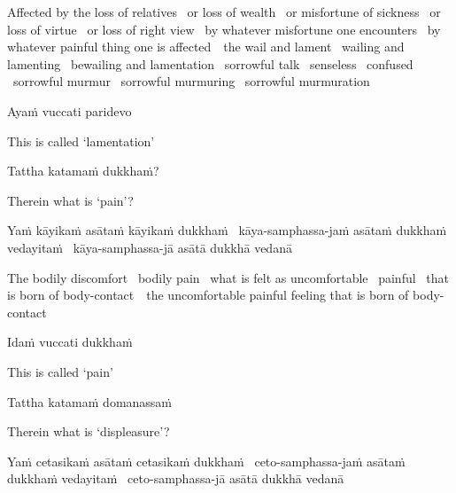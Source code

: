 \begin{english-hang-verses}
  Affected by the loss of relatives \breathmark\ or loss of wealth \breathmark\ or misfortune of sickness \breathmark\ or loss of virtue \breathmark\ or loss of right view \breathmark\ by whatever misfortune one encounters \breathmark\ by whatever painful thing one is \mbox{affected}~\breathmark\ the wail and lament \breathmark\ wailing and lamenting \breathmark\ bewailing and lamentation \breathmark\ sorrowful talk \breathmark\ senseless \breathmark\ confused \breathmark\ sorrowful murmur \breathmark\ sorrowful murmuring \breathmark\ sorrowful murmuration
\end{english-hang-verses}

Ayaṁ vuccati paridevo

\begin{english}
  This is called `lamentation'
\end{english}

Tattha katamaṁ dukkhaṁ?

\begin{english}
  Therein what is `pain'?
\end{english}

\ifbfive\clearpage\fi
\ifninebythirteen\clearpage\fi

\begin{pali-hang}
  Yaṁ kāyikaṁ asātaṁ kāyikaṁ dukkhaṁ \breathmark\ kāya-samphassa-jaṁ asātaṁ dukkhaṁ vedayitaṁ \breathmark\ kāya-samphassa-jā asātā dukkhā vedanā
\end{pali-hang}

\begin{english-hang-verses}
  The bodily discomfort \breathmark\ bodily pain \breathmark\ what is felt as uncomfortable \breathmark\ painful \breathmark\ that is born of \mbox{body-contact}~\breathmark\ the uncomfortable painful feeling that is born of body-contact
\end{english-hang-verses}

Idaṁ vuccati dukkhaṁ

\begin{english}
  This is called `pain'
\end{english}

Tattha katamaṁ domanassaṁ

\begin{english}
  Therein what is `displeasure'?
\end{english}

\begin{pali-hang}
  Yaṁ cetasikaṁ asātaṁ cetasikaṁ dukkhaṁ \breathmark\ ceto-samphassa-jaṁ asātaṁ dukkhaṁ vedayitaṁ \breathmark\ ceto-samphassa-jā asātā dukkhā vedanā
\end{pali-hang}

